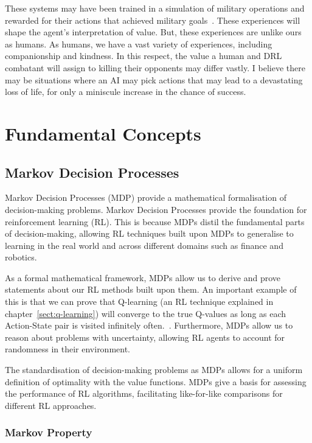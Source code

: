 \documentclass[]{final_report}
\begin{document}
These systems may have been trained in a simulation of military operations and rewarded for their actions that achieved military goals~\cite{rlMilitaryReviewChina}. These experiences will shape the agent's interpretation of value. But, these experiences are unlike ours as humans. As humans, we have a vast variety of experiences, including companionship and kindness. In this respect, the value a human and DRL combatant will assign to killing their opponents may differ vastly. I believe there may be situations where an AI may pick actions that may lead to a devastating loss of life, for only a miniscule increase in the chance of success. 

\chapter{Fundamental Concepts}
\label{chap:fundamental-concepts}
\section{Markov Decision Processes}

Markov Decision Processes (MDP) provide a mathematical formalisation of decision-making problems. Markov Decision Processes provide the foundation for reinforcement learning (RL). This is because MDPs distil the fundamental parts of decision-making, allowing RL techniques built upon MDPs to generalise to learning in the real world and across different domains such as finance and robotics. 

As a formal mathematical framework, MDPs allow us to derive and prove statements about our RL methods built upon them. An important example of this is that we can prove that Q-learning (an RL technique explained in chapter~\ref{sect:q-learning}) will converge to the true Q-values as long as each Action-State pair is visited infinitely often.~\cite{watkins1992q}. Furthermore, MDPs allow us to reason about problems with uncertainty, allowing RL agents to account for randomness in their environment. 

The standardisation of decision-making problems as MDPs allows for a uniform definition of optimality with the value functions. MDPs give a basis for assessing the performance of RL algorithms, facilitating like-for-like comparisons for different RL approaches. 


\subsection{Markov Property}
\end{document}
